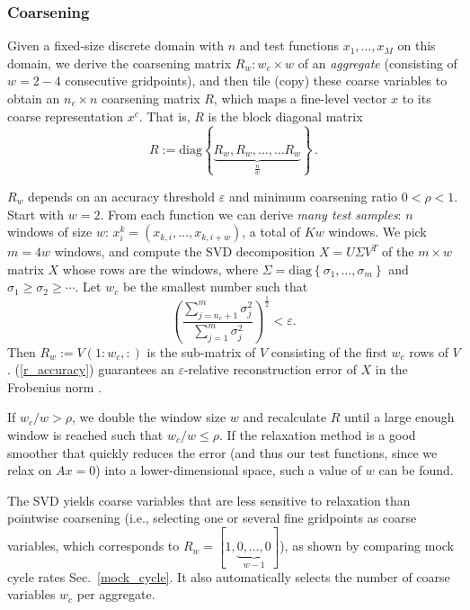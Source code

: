 \documentclass{article}
\begin{document}
\subsubsection{Coarsening}
Given a fixed-size discrete domain with $n$ and test functions $x_1,\dots,x_M$ on this domain, we derive the coarsening matrix $R_w: w_c \times w$ of an \emph{aggregate} (consisting of $w = 2-4$ consecutive gridpoints), and then tile (copy) these coarse variables to obtain an $n_c \times n$ coarsening matrix $R$, which maps a fine-level vector $x$ to its coarse representation $x^c$. That is, $R$ is the block diagonal matrix
\begin{equation}
	R := \text{diag} \left\{ \underbrace{R_w, R_w, \dots, ... R_w }_{\frac{n}{w}}  \right\} \,.
\end{equation}

$R_w$ depends on an accuracy threshold $\varepsilon$ and minimum coarsening ratio $0 < \rho < 1$. Start with $w = 2$. From each function we can derive \emph{many test samples}: $n$ windows of size $w$: $x^k_i = (x_{k,i},\dots,x_{k,i+w})$, a total of $Kw$ windows. We pick $m = 4 w$ windows, and compute the SVD decomposition $X = U \Sigma V^T$ of the $m \times w$ matrix $X$ whose rows are the windows, where $\Sigma = \text{diag}\left\{\sigma_1, \dots, \sigma_m \right\}$ and $\sigma_1 \geq \sigma_2 \geq \cdots$. Let $w_c$ be the smallest number such that
\begin{equation}
	\left(\frac{\sum_{j=n_c+1}^m \sigma_j^2}{\sum_{j=1}^m \sigma_j^2 } \right)^{\frac12} < \varepsilon.
	\label{r_accuracy}
\end{equation}
Then $R_w := V(1:w_c,:)$ is the sub-matrix of $V$ consisting of the first $w_c$ rows of $V$. (\ref{r_accuracy}) guarantees an $\varepsilon$-relative reconstruction error of $X$ in the Frobenius norm \cite{svd}.

If $w_c/w > \rho$, we double the window size $w$ and recalculate $R$ until a large enough window is reached such that $w_c/w \leq \rho$. If the relaxation method is a good smoother that quickly reduces the error (and thus our test functions, since we relax on $A x = 0$) into a lower-dimensional space, such a value of $w$ can be found.

The SVD yields coarse variables that are less sensitive to relaxation than pointwise coarsening (i.e., selecting one or several fine gridpoints as coarse variables, which corresponds to $R_w = [1,\underbrace{0,\dots,0}_{w-1}]$), as shown by comparing mock cycle rates Sec.~\ref{mock_cycle}. It also automatically selects the number of coarse variables $w_c$ per aggregate.
\end{document}
